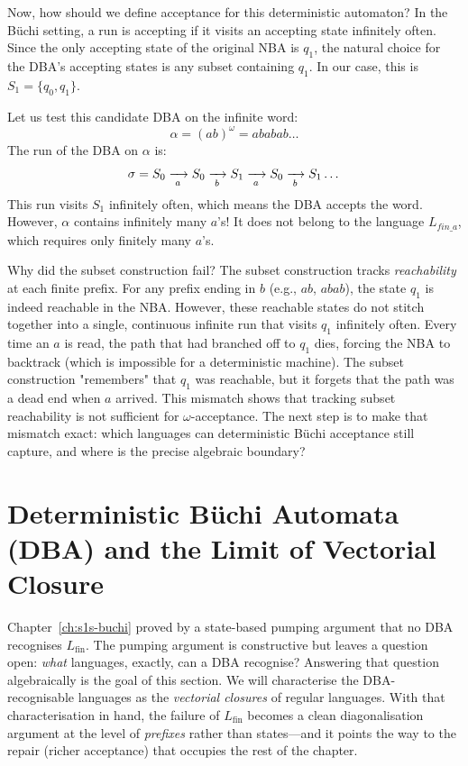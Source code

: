 Now, how should we define acceptance for this deterministic automaton? In the Büchi setting, a run is accepting if it visits an accepting state infinitely often. Since the only accepting state of the original NBA is $q_1$, the natural choice for the DBA's accepting states is any subset containing $q_1$. In our case, this is $S_1 = \{q_0, q_1\}$.

Let us test this candidate DBA on the infinite word:
$$\alpha = (ab)^\omega = a b a b a b \dots$$
The run of the DBA on $\alpha$ is:
$$\sigma = S_0 \xrightarrow[{\;a\;}]{} S_0 \xrightarrow[{\;b\;}]{} S_1 \xrightarrow[{\;a\;}]{} S_0 \xrightarrow[{\;b\;}]{} S_1 \dots$$
This run visits $S_1$ infinitely often, which means the DBA accepts the word. However, $\alpha$ contains infinitely many $a$'s! It does not belong to the language $L_{fin\_a}$, which requires only finitely many $a$'s.

Why did the subset construction fail?
The subset construction tracks \emph{reachability} at each finite prefix. For any prefix ending in $b$ (e.g., $ab$, $abab$), the state $q_1$ is indeed reachable in the NBA. However, these reachable states do not stitch together into a single, continuous infinite run that visits $q_1$ infinitely often. Every time an $a$ is read, the path that had branched off to $q_1$ dies, forcing the NBA to backtrack (which is impossible for a deterministic machine). The subset construction "remembers" that $q_1$ was reachable, but it forgets that the path was a dead end when $a$ arrived. This mismatch shows that tracking subset reachability is not sufficient for $\omega$-acceptance. The next step is to make that mismatch exact: which languages can deterministic Büchi acceptance still capture, and where is the precise algebraic boundary?

\section{Deterministic Büchi Automata (DBA) and the Limit of Vectorial Closure}
\label{sec:dba-limit}

Chapter~\ref{ch:s1s-buchi} proved by a state-based pumping argument that no DBA recognises $L_{\mathrm{fin}}$. The pumping argument is constructive but leaves a question open: \emph{what} languages, exactly, can a DBA recognise? Answering that question algebraically is the goal of this section. We will characterise the DBA-recognisable languages as the \emph{vectorial closures} of regular languages. With that characterisation in hand, the failure of $L_{\mathrm{fin}}$ becomes a clean diagonalisation argument at the level of \emph{prefixes} rather than states---and it points the way to the repair (richer acceptance) that occupies the rest of the chapter.

